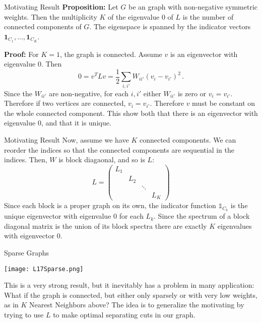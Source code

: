 \documentclass[10pt, table, dvipsnames,xcdraw,handout]{beamer}
\begin{document}
\begin{frame}[fragile]{Motivating Result}
\textbf{Proposition:} Let $G$ be an graph with non-negative symmetric weights. Then the multiplicity $K$ of the eigenvalue 0 of $L$ is the number of connected components of $G$. The eigenspace is spanned by the indicator vectors $\mathbf{1}_{C_1},\ldots, \mathbf{1}_{C_{K}}$.\pause


\textbf{Proof:} For $K=1$, the graph is connected. Assume $v$ is an eigenvector with eigenvalue 0. Then 
$$
0 = v^TLv = \frac12 \sum_{i,i'} W_{ii'}(v_i-v_{i'})^2\,.
$$
Since the $W_{ii'}$ are non-negative, for each $i,i'$ either $W_{ii'}$ is zero or $v_i = v_{i'}$. Therefore if two vertices are connected, $v_i = v_{i'}$. Therefore $v$ must be constant on the whole connected component. This show both that there is an eigenvector with eigenvalue 0, and that it is unique. 
\end{frame}



\begin{frame}[fragile]{Motivating Result}
Now, assume we have $K$ connected components. We can reorder the indices so that the connected components are sequential in the indices. Then, $W$ is block diagaonal, and so is $L$:
$$
L = \left(
\begin{matrix}
L_1&&&\\
&L_2&&\\
&&\ddots&\\
&&&L_K
\end{matrix}
\right)
$$\pause
Since each block is a proper graph on its own, the indicator function $\mathbb{1}_{C_k}$ is the unique eigenvector  with eigenvalue 0 for each $L_k$. Since the spectrum of a block diagonal matrix is the union of its block spectra there are exactly $K$ eigenvalues with eigenvector 0. 
\end{frame}





\begin{frame}[fragile]{Sparse Graphs}
  \begin{minipage}[t][0.6\textheight][t]{\textwidth}
	\centering \texttt{[image: L17Sparse.png]}
  \end{minipage}
  \vfill
\begin{minipage}[t][0.4\textheight][t]{\textwidth}
This is a very strong result, but it inevitably has a problem in many application: What if the graph is connected, but either only sparsely or with very low weights, as in $K$ Nearest Neighbors above? The idea is to generalize the motivating by trying to use $L$ to make optimal separating cuts in our graph. 
\end{minipage}
\end{frame}
\end{document}
